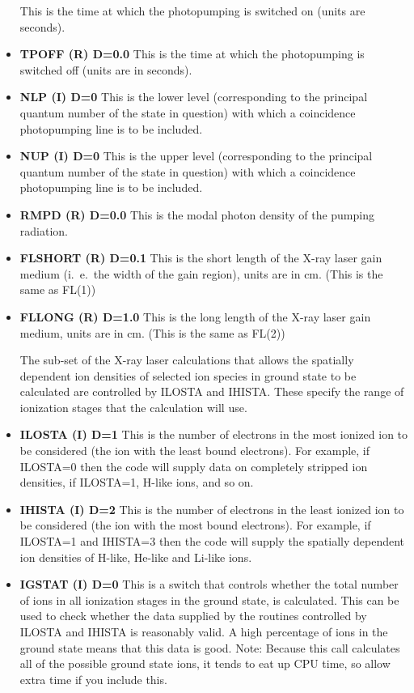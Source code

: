 \begin{itemize}
This is the time at which the photopumping is switched on
(units are seconds).
\item {\bf TPOFF (R) D=0.0}
This is the time at which the photopumping is switched off
(units are in seconds).
\item {\bf NLP (I) D=0}
This is the lower level (corresponding to the principal quantum number
of the state in question) with which a coincidence photopumping line
is to be included.
\item {\bf NUP (I) D=0}
This is the upper level (corresponding to the principal quantum number
of the state in question) with which a coincidence photopumping line
is to be included.
\item {\bf RMPD (R) D=0.0}
This is the modal photon density of the pumping radiation.
\item {\bf FLSHORT (R) D=0.1}
This is the short length of the X-ray laser gain medium
(i.\ e.\ the width
of the gain region), units are in cm. (This is the same as FL(1))
\item {\bf FLLONG (R) D=1.0}
This is the long length of the X-ray laser gain medium, units are in cm. (This is the same as FL(2))
 
The sub-set of the X-ray laser calculations that allows the spatially
dependent ion densities of selected ion species in ground state
to be calculated
are controlled by ILOSTA and IHISTA.
These specify the range of ionization
stages that the calculation will use.
\item {\bf ILOSTA (I) D=1}
This is the number of electrons in the most
ionized ion to be considered
(the ion with the least bound electrons). For
example, if ILOSTA=0 then the code will supply data on completely
stripped ion densities, if ILOSTA=1, H-like ions, and so on.
\item {\bf IHISTA (I) D=2}
This is the number of electrons in the least
ionized ion to be considered
(the ion with the most bound electrons). For example,
if ILOSTA=1 and IHISTA=3 then the code will supply the spatially
dependent ion densities of H-like, He-like and Li-like ions.
\item {\bf IGSTAT (I) D=0}
This is a switch that controls whether the total number of ions
in all ionization stages in the ground state, is calculated. This
can be used to check whether the data supplied by the routines
controlled by ILOSTA and IHISTA is reasonably valid. A high percentage
of ions in the ground state means that this data is good.
Note: Because this call calculates all of the possible ground state
ions, it tends to eat up CPU time, so allow extra time if you
include this.
\end{itemize}
\vspace*{5mm}

